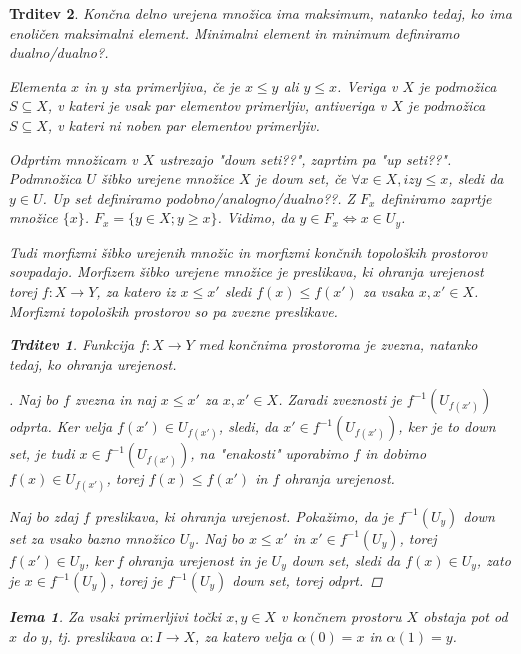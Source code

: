\documentclass[a4paper,12pt]{article}
\theoremstyle{definition}
\theoremstyle{plain}
\theoremstyle{definition}
\theoremstyle{plain}
\newtheorem{trditev}{Trditev}
\theoremstyle{plain}
\theoremstyle{plain}
\theoremstyle{plain}
\newtheorem{lema}{Iema}
\newenvironment{dokaz}{\begin{proof}[\bfseries\upshape\proofname]}{\end{proof}}
\begin{document}
\begin{trditev}
Končna delno urejena množica ima maksimum, natanko tedaj, ko ima enoličen maksimalni element. \textit{Minimalni element} in \textit{minimum} definiramo dualno/dualno?.

Elementa $x$ in $y$ sta \textit{primerljiva}, če je $x\leq y$ ali $y\leq x$. \textit{Veriga} v $X$ je podmožica $S\subseteq X$, v kateri je vsak par elementov primerljiv, \textit{antiveriga} v $X$ je podmožica $S\subseteq X$, v kateri ni noben par elementov primerljiv. 

Odprtim množicam v $X$ ustrezajo \textit{"down seti??"}, zaprtim pa \textit{"up seti??"}. Podmnožica $U$
 šibko urejene množice $X$ je down set, če $\forall x\in X, iz y\leq x$, sledi da $y\in U$. Up set definiramo podobno/analogno/dualno??.
Z $F_x$ definiramo zaprtje množice $\{x\}$. $F_x=\{y\in X; y\geq x\}$. Vidimo, da $y\in F_x \Leftrightarrow x\in U_y$.

Tudi morfizmi šibko urejenih množic in morfizmi končnih topoloških prostorov sovpadajo.
  Morfizem šibko urejene množice je preslikava, ki ohranja urejenost torej $f: X\rightarrow Y$, 
  za katero iz $x\leq x'$ sledi $f(x)\leq f(x')$ za vsaka $x,x'\in X$. Morfizmi topoloških prostorov so pa zvezne preslikave.

\begin{trditev}
Funkcija $f:X\rightarrow Y$ med končnima prostoroma je zvezna, natanko tedaj, ko ohranja urejenost.
\end{trditev}

\begin{dokaz}
    Naj bo $f$ zvezna in naj $x\leq x'$ za $x, x' \in X$. Zaradi zveznosti je $f^{-1}(U_{f(x')})$ odprta. Ker velja $f(x')\in U_{f(x')}$, sledi, da $x'\in f^{-1}(U_{f(x')})$, ker je to down set, je tudi $x\in f^{-1}(U_{f(x')})$, na "enakosti" uporabimo $f$ in dobimo $f(x)\in U_{f(x')}$, torej $f(x)\leq f(x')$ in $f$ ohranja urejenost.

    Naj bo zdaj $f$ preslikava, ki ohranja urejenost. Pokažimo, da je $f^{-1}(U_y)$ down set za vsako bazno množico $U_y$. Naj bo $x\leq x'$ in $x'\in f^{-1}(U_y)$, torej $f(x') \in U_y$, ker f ohranja urejenost in je $U_y$ down set, sledi da $f(x)\in U_y$, zato je $x\in f^{-1}(U_y)$, torej je $f^{-1}(U_y)$ down set, torej odprt.


\end{dokaz}


\begin{lema}\label{lem:pot}
    Za vsaki primerljivi točki $x,y\in X$ v končnem prostoru $X$ obstaja pot od $x$ do $y$, tj. preslikava $\alpha: I \rightarrow X$, za katero velja $\alpha(0)=x$ in $\alpha(1)=y$.


\end{lema}
\end{trditev}
\end{document}
